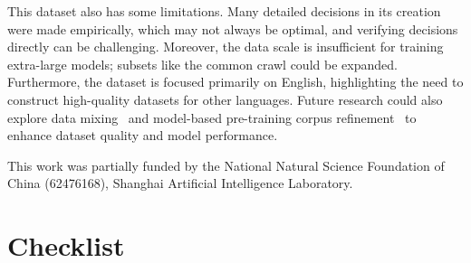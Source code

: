 This dataset also has some limitations. Many detailed decisions in its creation were made empirically, which may not always be optimal, and verifying decisions directly can be challenging. Moreover, the data scale is insufficient for training extra-large models; subsets like the common crawl could be expanded. Furthermore, the dataset is focused primarily on English, highlighting the need to construct high-quality datasets for other languages. Future research could also explore data mixing~\citep{liu2024regmix} and model-based pre-training corpus refinement~\citep{yu2024mates,zhou2024programming} to enhance dataset quality and model performance.

\begin{ack}
  This work was partially funded by the National Natural Science Foundation of China (62476168), Shanghai Artificial Intelligence Laboratory.
\end{ack}

\clearpage

\section*{Checklist}

